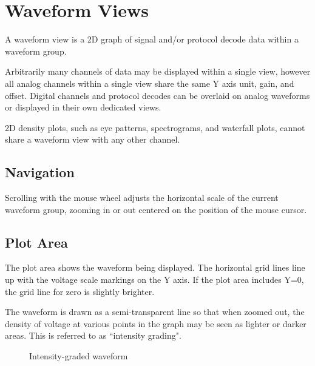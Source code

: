 \chapter{Waveform Views}

A waveform view is a 2D graph of signal and/or protocol decode data within a waveform group.

Arbitrarily many channels of data may be displayed within a single view, however all analog channels within a single
view share the same Y axis unit, gain, and offset. Digital channels and protocol decodes can be overlaid on analog
waveforms or displayed in their own dedicated views.

2D density plots, such as eye patterns, spectrograms, and waterfall plots, cannot share a waveform view
with any other channel.

\section{Navigation}

Scrolling with the mouse wheel adjusts the horizontal scale of the current waveform group, zooming in or out centered
on the position of the mouse cursor.



\section{Plot Area}

The plot area shows the waveform being displayed. The horizontal grid lines line up with the voltage scale markings on
the Y axis. If the plot area includes Y=0, the grid line for zero is slightly brighter.

The waveform is drawn as a semi-transparent line so that when zoomed out, the density of voltage at various points in
the graph may be seen as lighter or darker areas. This is referred to as ``intensity grading".

\begin{figure}[H]
\centering
{}
\caption{Intensity-graded waveform}
\label{graded-waveform2}
\end{figure}

